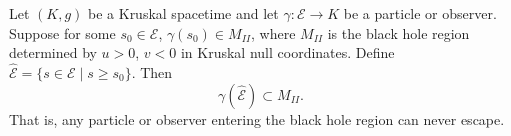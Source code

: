 Let $(K,g)$ be a Kruskal spacetime and let $\gamma: \mathcal{E} \rightarrow K$ be a particle or observer. Suppose for some $s_0 \in \mathcal{E}$, $\gamma(s_0) \in M_{II}$, where $M_{II}$ is the black hole region determined by $u > 0$, $v < 0$ in Kruskal null coordinates. Define $\hat{\mathcal{E}} = \{s \in \mathcal{E} \mid s \geq s_0\}$. Then
$$\gamma(\hat{\mathcal{E}}) \subset M_{II}.$$
That is, any particle or observer entering the black hole region can never escape.
